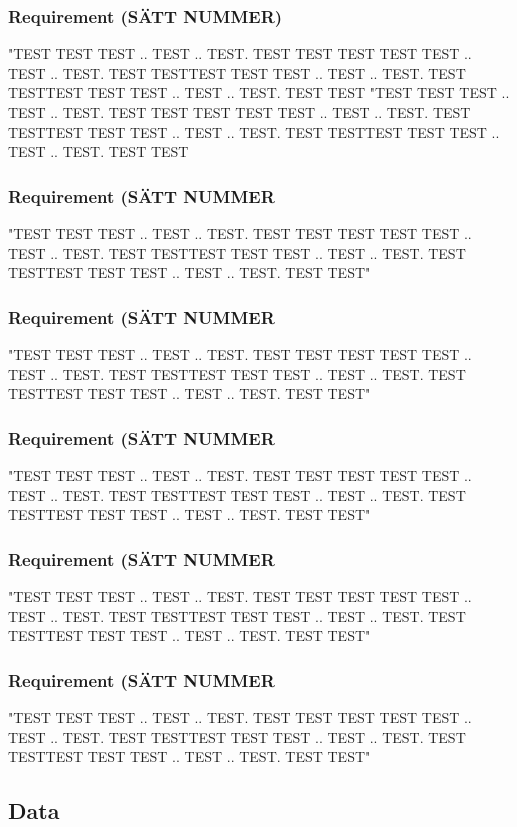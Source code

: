 \documentclass{article}
\begin{document}
\subsubsection{Requirement (SÄTT NUMMER)}
"TEST TEST TEST .. TEST .. TEST. TEST TEST TEST TEST TEST .. TEST .. TEST. TEST TESTTEST TEST TEST .. TEST .. TEST. TEST TESTTEST TEST TEST .. TEST .. TEST. TEST TEST
"TEST TEST TEST .. TEST .. TEST. TEST TEST TEST TEST TEST .. TEST .. TEST. TEST TESTTEST TEST TEST .. TEST .. TEST. TEST TESTTEST TEST TEST .. TEST .. TEST. TEST TEST
\subsubsection{Requirement (SÄTT NUMMER}
"TEST TEST TEST .. TEST .. TEST. TEST TEST TEST TEST TEST .. TEST .. TEST. TEST TESTTEST TEST TEST .. TEST .. TEST. TEST TESTTEST TEST TEST .. TEST .. TEST. TEST TEST"
\subsubsection{Requirement (SÄTT NUMMER}
"TEST TEST TEST .. TEST .. TEST. TEST TEST TEST TEST TEST .. TEST .. TEST. TEST TESTTEST TEST TEST .. TEST .. TEST. TEST TESTTEST TEST TEST .. TEST .. TEST. TEST TEST"
\subsubsection{Requirement (SÄTT NUMMER}
"TEST TEST TEST .. TEST .. TEST. TEST TEST TEST TEST TEST .. TEST .. TEST. TEST TESTTEST TEST TEST .. TEST .. TEST. TEST TESTTEST TEST TEST .. TEST .. TEST. TEST TEST"
\subsubsection{Requirement (SÄTT NUMMER}
"TEST TEST TEST .. TEST .. TEST. TEST TEST TEST TEST TEST .. TEST .. TEST. TEST TESTTEST TEST TEST .. TEST .. TEST. TEST TESTTEST TEST TEST .. TEST .. TEST. TEST TEST"
\subsubsection{Requirement (SÄTT NUMMER}
"TEST TEST TEST .. TEST .. TEST. TEST TEST TEST TEST TEST .. TEST .. TEST. TEST TESTTEST TEST TEST .. TEST .. TEST. TEST TESTTEST TEST TEST .. TEST .. TEST. TEST TEST"


\subsection{Data}
\end{document}
